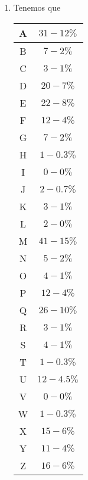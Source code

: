 \documentclass[letterpaper,11pt]{article}
\begin{document}
\begin{enumerate}
\begin{enumerate}
\begin{enumerate}
            \item Tenemos que
            \begin{center}
                \begin{tabular}{|c|c|}
                \hline
                A & $31-12\%$ \\ \hline
                B & $7-2\%$ \\ \hline
                C & $3-1\%$ \\ \hline
                D & $20-7\%$ \\ \hline
                E & $22-8\%$ \\ \hline
                F & $12-4\%$ \\ \hline
                G & $7-2\%$ \\ \hline
                H & $1-0.3\%$ \\ \hline
                I & $0-0\%$ \\ \hline
                J & $2-0.7\%$ \\ \hline
                K & $3-1\%$ \\ \hline
                L & $2-0\%$ \\ \hline
                M & $41-15\%$ \\ \hline
                N & $5-2\%$ \\ \hline
                O & $4-1\%$ \\ \hline
                P & $12-4\%$\\ \hline
                Q & $26-10\%$ \\ \hline
                R & $3-1\%$ \\ \hline
                S & $4-1\%$ \\ \hline
                T & $1-0.3\%$ \\ \hline
                U & $12-4.5\%$ \\ \hline
                V & $0-0\%$ \\ \hline
                W & $1-0.3\%$ \\ \hline
                X & $15-6\%$ \\ \hline
                Y & $11-4\%$ \\ \hline
                Z & $16-6\%$ \\ \hline
                \end{tabular}
            \end{center}


\end{enumerate}
\end{enumerate}
\end{enumerate}
\end{document}
